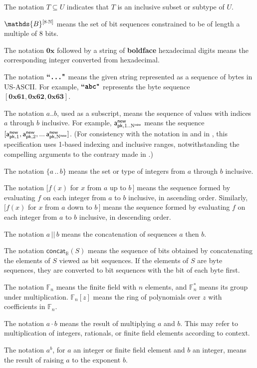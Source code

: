 \documentclass{article}
\renewcommand{\emph}[1]{\hspace{0.15em}{\fontfamily{pnc}\selectfont\scalebox{1.02}[0.999]{\textit{#1}}}\hspace{0.02em}}
\let\oldtexttt\texttt
\renewcommand{\texttt}[1]{\scalebox{1.02}[1.07]{\oldtexttt{#1}}}
\newcommand{\bit}{\mathds{B}}
\newcommand{\Nat}{\mathbb{N}}
\newcommand{\typeexp}[2]{{#1}\vphantom{)}^{[{#2}]}}
\newcommand{\byteseqs}{\typeexp{\bit}{8\mult\Nat}}
\newcommand{\concatbits}{\mathsf{concat}_\bit}
\newcommand{\hexint}[1]{\mathbf{0x{#1}}}
\newcommand{\ascii}[1]{\textbf{``\texttt{#1}"}}
\newcommand{\range}[2]{\{{#1}\,..\,{#2}\}}
\newcommand{\mult}{\cdot}
\newcommand{\AuthPublicNew}[1]{\mathsf{a^{new}_{pk,\mathnormal{#1}}}}
\newcommand{\NNew}{\mathrm{N}^\mathsf{new}}
\newcommand{\allN}[1]{\mathrm{1}..\mathrm{N}^\mathsf{#1}}
\newcommand{\allNew}{\allN{new}}
\newcommand{\GF}[1]{\mathbb{F}_{#1}}
\newcommand{\GFstar}[1]{\mathbb{F}^\ast_{#1}}
\begin{document}
The notation $T \subseteq U$ indicates that $T$ is an inclusive subset or subtype of $U$.

$\byteseqs$ means the set of bit sequences constrained to be of length
a multiple of 8 bits.

The notation $\hexint{}$ followed by a string of \textbf{boldface} hexadecimal
digits means the corresponding integer converted from hexadecimal.

The notation $\ascii{...}$ means the given string represented as a
sequence of bytes in US-ASCII. For example, $\ascii{abc}$ represents the
byte sequence $[\hexint{61}, \hexint{62}, \hexint{63}]$.

The notation $a..b$, used as a subscript, means the sequence of values
with indices $a$ through $b$ inclusive. For example,
$\AuthPublicNew{\allNew}$ means the sequence $[\AuthPublicNew{\mathrm{1}},
\AuthPublicNew{\mathrm{2}}, ...\,\AuthPublicNew{\NNew}]$.
(For consistency with the notation in \cite{BCG+2014} and in \cite{BK2016},
this specification uses 1-based indexing and inclusive ranges,
notwithstanding the compelling arguments to the contrary made in
\cite{EWD-831}.)

The notation $\range{a}{b}$ means the set or type of integers from $a$ through
$b$ inclusive.

The notation $[f(x)$ for $x$ from $a$ up to $b\,]$ means the sequence
formed by evaluating $f$ on each integer from $a$ to $b$ inclusive, in
ascending order. Similarly, $[f(x)$ for $x$ from $a$ down to $b\,]$ means
the sequence formed by evaluating $f$ on each integer from $a$ to $b$
inclusive, in descending order.

The notation $a\,||\,b$ means the concatenation of sequences $a$ then $b$.

The notation $\concatbits(S)$ means the sequence of bits obtained by
concatenating the elements of $S$ viewed as bit sequences. If the
elements of $S$ are byte sequences, they are converted to bit sequences
with the \emph{most significant} bit of each byte first.

The notation $\GF{n}$ means the finite field with $n$ elements, and
$\GFstar{n}$ means its group under multiplication.
$\GF{n}[z]$ means the ring of polynomials over $z$ with coefficients
in $\GF{n}$.

The notation $a \mult b$ means the result of multiplying $a$ and $b$.
This may refer to multiplication of integers, rationals, or
finite field elements according to context.

The notation $a^b$, for $a$ an integer or finite field element and
$b$ an integer, means the result of raising $a$ to the exponent $b$.
\end{document}
